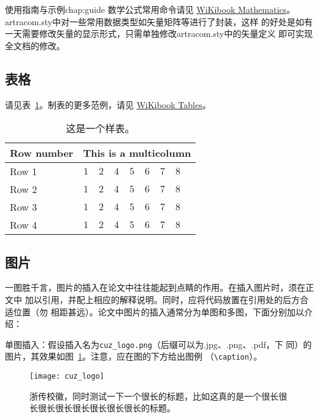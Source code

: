\begin{cuzchapter}{使用指南与示例}{chap:guide}
    数学公式常用命令请见
    \href{https://en.wikibooks.org/wiki/LaTeX/Mathematics}{WiKibook
        Mathematics}。 artracom.sty中对一些常用数据类型如矢量矩阵等进行了封装，这样
    的好处是如有一天需要修改矢量的显示形式，只需单独修改artracom.sty中的矢量定义
    即可实现全文档的修改。

    \subsection{表格}\label{sub:tables}

    请见表~\ref{tab:sample}。制表的更多范例，请见
    \href{https://en.wikibooks.org/wiki/LaTeX/Tables}{WiKibook Tables}。
    \begin{table}[!htbp]
        \caption[样表]{这是一个样表。}
        \label{tab:sample}
        \centering
        \footnotesize%
        \setlength{\tabcolsep}{4pt}%
        \renewcommand{\arraystretch}{1.2}%
        \begin{tabular}{lcccccccc}
            \hline
            Row number & \multicolumn{8}{c}{This is a multicolumn}                                     \\
            \hline
            Row 1      & $1$                                       & $2$ & $4$ & $5$ & $6$ & $7$ & $8$ \\
            Row 2      & $1$                                       & $2$ & $4$ & $5$ & $6$ & $7$ & $8$ \\
            Row 3      & $1$                                       & $2$ & $4$ & $5$ & $6$ & $7$ & $8$ \\
            Row 4      & $1$                                       & $2$ & $4$ & $5$ & $6$ & $7$ & $8$ \\
            \hline
        \end{tabular}
    \end{table}

    \subsection{图片}\label{sub:images}

    一图胜千言，图片的插入在论文中往往能起到点睛的作用。在插入图片时，须在正文中
    加以引用，并配上相应的解释说明。同时，应将代码放置在引用处的后方合适位置（勿
    相距甚远）。论文中图片的插入通常分为单图和多图，下面分别加以介绍：

    单图插入：假设插入名为\verb|cuz_logo.png|（后缀可以为.jpg、.png、.pdf，下
    同）的图片，其效果如图~\ref{fig:cuz_logo}。注意，应在图的下方给出图例
    （\verb|\caption|）。
    \begin{figure}[h]
        \centering
        \texttt{[image: cuz\_logo]}
        \caption[浙传校徽]{浙传校徽，同时测试一下一个很长的标题，比如这真的是一个很长很长很长很长很长很长很长很长的标题。}
        \label{fig:cuz_logo}
    \end{figure}


\end{cuzchapter}
